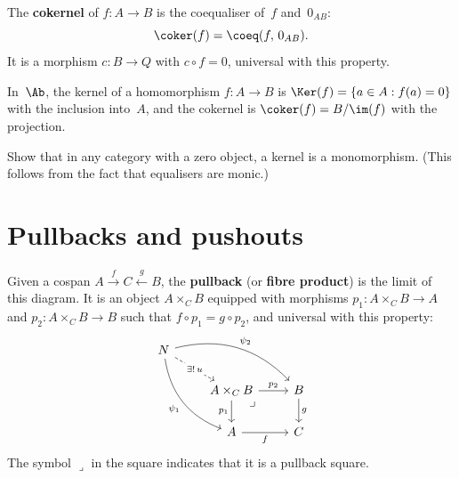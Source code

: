 \begin{definition}[Cokernel]\label{def:cokernel-categorical}
The \textbf{cokernel} of $f\colon A\to B$ is the coequaliser of~$f$
and~$0_{AB}$:
\[
\coker(f) = \coeq(f,\,0_{AB}).
\]
It is a morphism $c\colon B\to Q$ with $c\circ f = 0$, universal
with this property.
\end{definition}

\begin{example}\label{ex:ker-coker-ab}
In~$\Ab$, the kernel of a homomorphism $f\colon A\to B$ is
$\Ker(f) = \{a\in A : f(a) = 0\}$ with the inclusion into~$A$,
and the cokernel is $\coker(f) = B/\im(f)$ with the projection.
\end{example}

\begin{exercise}\label{exer:kernel-mono}
Show that in any category with a zero object, a kernel is a monomorphism.
(This follows from the fact that equalisers are monic.)
\end{exercise}


\section{Pullbacks and pushouts}\label{sec:pullbacks-pushouts}

\begin{definition}[Pullback]\label{def:pullback}
Given a cospan $A \xrightarrow{f} C \xleftarrow{g} B$, the
\textbf{pullback} (or \textbf{fibre product}) is the limit of this
diagram.  It is an object $A\times_C B$ equipped with morphisms
$p_1\colon A\times_C B\to A$ and $p_2\colon A\times_C B\to B$
such that $f\circ p_1 = g\circ p_2$, and universal with this property:
\[
\begin{tikzcd}
N \arrow[drr, bend left, "\psi_2"]
  \arrow[ddr, bend right, "\psi_1"']
  \arrow[dr, dashed, "\exists!\,u" description] & & \\
& A\times_C B \arrow[r, "p_2"] \arrow[d, "p_1"']
    \arrow[dr, phantom, "\lrcorner" very near start]
  & B \arrow[d, "g"] \\
& A \arrow[r, "f"'] & C
\end{tikzcd}
\]
The symbol $\lrcorner$ in the square indicates that it is a pullback square.
\end{definition}

